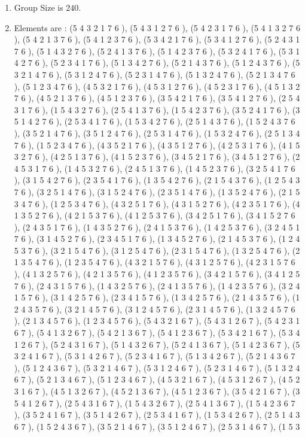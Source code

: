 \documentclass[12pt]{article}
\begin{document}
\begin{enumerate}
\item Group Size is $240$.
\item Elements are : (5 4 3 2 1 7 6  ), (5 4 3 1 2 7 6  ), (5 4 2 3 1 7 6  ), (5 4 1 3 2 7 6  ), (5 4 2 1 3 7 6  ), (5 4 1 2 3 7 6  ), (5 3 4 2 1 7 6  ), (5 3 4 1 2 7 6  ), (5 2 4 3 1 7 6  ), (5 1 4 3 2 7 6  ), (5 2 4 1 3 7 6  ), (5 1 4 2 3 7 6  ), (5 3 2 4 1 7 6  ), (5 3 1 4 2 7 6  ), (5 2 3 4 1 7 6  ), (5 1 3 4 2 7 6  ), (5 2 1 4 3 7 6  ), (5 1 2 4 3 7 6  ), (5 3 2 1 4 7 6  ), (5 3 1 2 4 7 6  ), (5 2 3 1 4 7 6  ), (5 1 3 2 4 7 6  ), (5 2 1 3 4 7 6  ), (5 1 2 3 4 7 6  ), (4 5 3 2 1 7 6  ), (4 5 3 1 2 7 6  ), (4 5 2 3 1 7 6  ), (4 5 1 3 2 7 6  ), (4 5 2 1 3 7 6  ), (4 5 1 2 3 7 6  ), (3 5 4 2 1 7 6  ), (3 5 4 1 2 7 6  ), (2 5 4 3 1 7 6  ), (1 5 4 3 2 7 6  ), (2 5 4 1 3 7 6  ), (1 5 4 2 3 7 6  ), (3 5 2 4 1 7 6  ), (3 5 1 4 2 7 6  ), (2 5 3 4 1 7 6  ), (1 5 3 4 2 7 6  ), (2 5 1 4 3 7 6  ), (1 5 2 4 3 7 6  ), (3 5 2 1 4 7 6  ), (3 5 1 2 4 7 6  ), (2 5 3 1 4 7 6  ), (1 5 3 2 4 7 6  ), (2 5 1 3 4 7 6  ), (1 5 2 3 4 7 6  ), (4 3 5 2 1 7 6  ), (4 3 5 1 2 7 6  ), (4 2 5 3 1 7 6  ), (4 1 5 3 2 7 6  ), (4 2 5 1 3 7 6  ), (4 1 5 2 3 7 6  ), (3 4 5 2 1 7 6  ), (3 4 5 1 2 7 6  ), (2 4 5 3 1 7 6  ), (1 4 5 3 2 7 6  ), (2 4 5 1 3 7 6  ), (1 4 5 2 3 7 6  ), (3 2 5 4 1 7 6  ), (3 1 5 4 2 7 6  ), (2 3 5 4 1 7 6  ), (1 3 5 4 2 7 6  ), (2 1 5 4 3 7 6  ), (1 2 5 4 3 7 6  ), (3 2 5 1 4 7 6  ), (3 1 5 2 4 7 6  ), (2 3 5 1 4 7 6  ), (1 3 5 2 4 7 6  ), (2 1 5 3 4 7 6  ), (1 2 5 3 4 7 6  ), (4 3 2 5 1 7 6  ), (4 3 1 5 2 7 6  ), (4 2 3 5 1 7 6  ), (4 1 3 5 2 7 6  ), (4 2 1 5 3 7 6  ), (4 1 2 5 3 7 6  ), (3 4 2 5 1 7 6  ), (3 4 1 5 2 7 6  ), (2 4 3 5 1 7 6  ), (1 4 3 5 2 7 6  ), (2 4 1 5 3 7 6  ), (1 4 2 5 3 7 6  ), (3 2 4 5 1 7 6  ), (3 1 4 5 2 7 6  ), (2 3 4 5 1 7 6  ), (1 3 4 5 2 7 6  ), (2 1 4 5 3 7 6  ), (1 2 4 5 3 7 6  ), (3 2 1 5 4 7 6  ), (3 1 2 5 4 7 6  ), (2 3 1 5 4 7 6  ), (1 3 2 5 4 7 6  ), (2 1 3 5 4 7 6  ), (1 2 3 5 4 7 6  ), (4 3 2 1 5 7 6  ), (4 3 1 2 5 7 6  ), (4 2 3 1 5 7 6  ), (4 1 3 2 5 7 6  ), (4 2 1 3 5 7 6  ), (4 1 2 3 5 7 6  ), (3 4 2 1 5 7 6  ), (3 4 1 2 5 7 6  ), (2 4 3 1 5 7 6  ), (1 4 3 2 5 7 6  ), (2 4 1 3 5 7 6  ), (1 4 2 3 5 7 6  ), (3 2 4 1 5 7 6  ), (3 1 4 2 5 7 6  ), (2 3 4 1 5 7 6  ), (1 3 4 2 5 7 6  ), (2 1 4 3 5 7 6  ), (1 2 4 3 5 7 6  ), (3 2 1 4 5 7 6  ), (3 1 2 4 5 7 6  ), (2 3 1 4 5 7 6  ), (1 3 2 4 5 7 6  ), (2 1 3 4 5 7 6  ), (1 2 3 4 5 7 6  ), (5 4 3 2 1 6 7  ), (5 4 3 1 2 6 7  ), (5 4 2 3 1 6 7  ), (5 4 1 3 2 6 7  ), (5 4 2 1 3 6 7  ), (5 4 1 2 3 6 7  ), (5 3 4 2 1 6 7  ), (5 3 4 1 2 6 7  ), (5 2 4 3 1 6 7  ), (5 1 4 3 2 6 7  ), (5 2 4 1 3 6 7  ), (5 1 4 2 3 6 7  ), (5 3 2 4 1 6 7  ), (5 3 1 4 2 6 7  ), (5 2 3 4 1 6 7  ), (5 1 3 4 2 6 7  ), (5 2 1 4 3 6 7  ), (5 1 2 4 3 6 7  ), (5 3 2 1 4 6 7  ), (5 3 1 2 4 6 7  ), (5 2 3 1 4 6 7  ), (5 1 3 2 4 6 7  ), (5 2 1 3 4 6 7  ), (5 1 2 3 4 6 7  ), (4 5 3 2 1 6 7  ), (4 5 3 1 2 6 7  ), (4 5 2 3 1 6 7  ), (4 5 1 3 2 6 7  ), (4 5 2 1 3 6 7  ), (4 5 1 2 3 6 7  ), (3 5 4 2 1 6 7  ), (3 5 4 1 2 6 7  ), (2 5 4 3 1 6 7  ), (1 5 4 3 2 6 7  ), (2 5 4 1 3 6 7  ), (1 5 4 2 3 6 7  ), (3 5 2 4 1 6 7  ), (3 5 1 4 2 6 7  ), (2 5 3 4 1 6 7  ), (1 5 3 4 2 6 7  ), (2 5 1 4 3 6 7  ), (1 5 2 4 3 6 7  ), (3 5 2 1 4 6 7  ), (3 5 1 2 4 6 7  ), (2 5 3 1 4 6 7  ), (1 5 3 
\end{enumerate}
\end{document}
